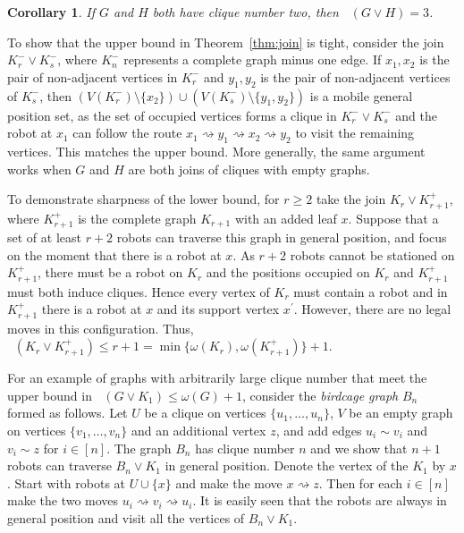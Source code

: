 \documentclass[a4paper,12pt]{article}
\DeclareMathOperator{\mob}{Mob_{gp}}
\newtheorem{corollary}[theorem]{Corollary}
\theoremstyle{definition}
\newcommand{\move}{\rightsquigarrow}
\begin{document}
	\begin{corollary}
		If $G$ and $H$ both have clique number two, then $\mob (G \vee H) = 3$.
	\end{corollary}
	
	To show that the upper bound in Theorem~\ref{thm:join} is tight, consider the join $K_r^- \vee K_s ^-$, where $K_n^-$ represents a complete graph minus one edge. If $x_1,x_2$ is the pair of non-adjacent vertices in $K_r^-$ and $y_1,y_2$ is the pair of non-adjacent vertices of $K_s^-$, then $(V(K_r^-) \setminus \{ x_2\} ) \cup (V(K_s^-)\setminus \{ y_1,y_2\} )$ is a mobile general position set, as the set of occupied vertices forms a clique in $K_r^- \vee K_s^-$ and the robot at $x_1$ can follow the route $x_1 \move y_1 \move x_2 \move y_2$ to visit the remaining vertices. This matches the upper bound. More generally, the same argument works when $G$ and $H$ are both joins of cliques with empty graphs.
	
	To demonstrate sharpness of the lower bound, for $r \geq 2$ take the join $K_r \vee K^+_{r+1}$, where $K^+_{r+1}$ is the complete graph $K_{r+1}$ with an added leaf $x$. Suppose that a set of at least $r+2$ robots can traverse this graph in general position, and focus on the moment that there is a robot at $x$. As $r+2$ robots cannot be stationed on $K_{r+1}^+$, there must be a robot on $K_r$ and the positions occupied on $K_r$ and $K_{r+1}^+$ must both induce cliques. Hence every vertex of $K_r$ must contain a robot and in $K_{r+1}^+$ there is a robot at $x$ and its support vertex $x^{\prime }$. However, there are no legal moves in this configuration. Thus, $\mob(K_r \vee K^+_{r+1}) \leq r+1 = \min \{ \omega(K_r),\omega (K^+_{r+1})\} +1$.
	
	For an example of graphs with arbitrarily large clique number that meet the upper bound in $\mob (G \vee K_1) \leq \omega (G)+1$, consider the \emph{birdcage graph} $B_n$ formed as follows. Let $U$ be a clique on vertices $\{ u_1,\dots ,u_n\}$, $V$ be an empty graph on vertices $\{ v_1,\dots ,v_n\} $ and an additional vertex $z$, and add edges $u_i \sim v_i$ and $v_i \sim z$ for $i \in [n]$. The graph $B_n$ has clique number $n$ and we show that $n+1$ robots can traverse $B_n \vee K_1$ in general position. Denote the vertex of the $K_1$ by $x$. Start with robots at $U \cup \{x \} $ and make the move $x \move z$. Then for each $i \in [n]$ make the two moves $u_i \move v_i \move u_i$. It is easily seen that the robots are always in general position and visit all the vertices of $B_n \vee K_1$.   
	
\end{document}
